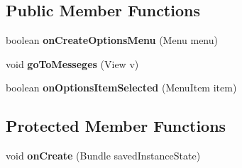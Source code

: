\subsection*{Public Member Functions}
\begin{DoxyCompactItemize}
\item 
boolean {\bfseries on\+Create\+Options\+Menu} (Menu menu)\hypertarget{classcom_1_1example_1_1sebastian_1_1tindertp_1_1ProfileActivity_ad4a8f1c68195e0532b58ae2377c9e5f1}{}\label{classcom_1_1example_1_1sebastian_1_1tindertp_1_1ProfileActivity_ad4a8f1c68195e0532b58ae2377c9e5f1}

\item 
void {\bfseries go\+To\+Messeges} (View v)\hypertarget{classcom_1_1example_1_1sebastian_1_1tindertp_1_1ProfileActivity_abef6296e752981402b3a3b68ced16a28}{}\label{classcom_1_1example_1_1sebastian_1_1tindertp_1_1ProfileActivity_abef6296e752981402b3a3b68ced16a28}

\item 
boolean {\bfseries on\+Options\+Item\+Selected} (Menu\+Item item)\hypertarget{classcom_1_1example_1_1sebastian_1_1tindertp_1_1ProfileActivity_a0c3b858d900aff7b2e1ce0ccd3c30cc9}{}\label{classcom_1_1example_1_1sebastian_1_1tindertp_1_1ProfileActivity_a0c3b858d900aff7b2e1ce0ccd3c30cc9}

\end{DoxyCompactItemize}
\subsection*{Protected Member Functions}
\begin{DoxyCompactItemize}
\item 
void {\bfseries on\+Create} (Bundle saved\+Instance\+State)\hypertarget{classcom_1_1example_1_1sebastian_1_1tindertp_1_1ProfileActivity_a2aacc09a50bf2c48c83c5d2b94ec5810}{}\label{classcom_1_1example_1_1sebastian_1_1tindertp_1_1ProfileActivity_a2aacc09a50bf2c48c83c5d2b94ec5810}

\end{DoxyCompactItemize}
